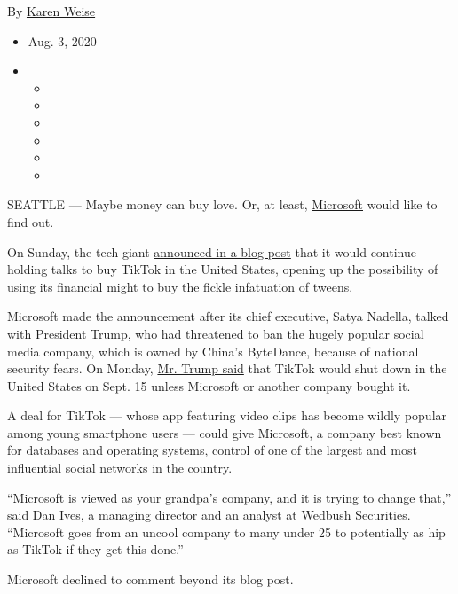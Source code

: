 By \href{https://www.nytimes3xbfgragh.onion/by/karen-weise}{Karen Weise}

\begin{itemize}
\item
  Aug. 3, 2020
\item
  \begin{itemize}
  \item
  \item
  \item
  \item
  \item
  \item
  \end{itemize}
\end{itemize}

SEATTLE --- Maybe money can buy love. Or, at least,
\href{https://www.nytimes3xbfgragh.onion/2020/08/03/us/navy-seal-museum-kaepernick.html}{Microsoft}
would like to find out.

On Sunday, the tech giant
\href{https://blogs.microsoft.com/blog/2020/08/02/microsoft-to-continue-discussions-on-potential-tiktok-purchase-in-the-united-states/}{announced
in a blog post} that it would continue holding talks to buy TikTok in
the United States, opening up the possibility of using its financial
might to buy the fickle infatuation of tweens.

Microsoft made the announcement after its chief executive, Satya
Nadella, talked with President Trump, who had threatened to ban the
hugely popular social media company, which is owned by China's
ByteDance, because of national security fears. On Monday,
\href{https://www.nytimes3xbfgragh.onion/2020/08/03/technology/trump-tiktok-microsoft.html?action=click\&module=Top\%20Stories\&pgtype=Homepage}{Mr.
Trump said} that TikTok would shut down in the United States on Sept. 15
unless Microsoft or another company bought it.

A deal for TikTok --- whose app featuring video clips has become wildly
popular among young smartphone users --- could give Microsoft, a company
best known for databases and operating systems, control of one of the
largest and most influential social networks in the country.

``Microsoft is viewed as your grandpa's company, and it is trying to
change that,'' said Dan Ives, a managing director and an analyst at
Wedbush Securities. ``Microsoft goes from an uncool company to many
under 25 to potentially as hip as TikTok if they get this done.''

Microsoft declined to comment beyond its blog post.

